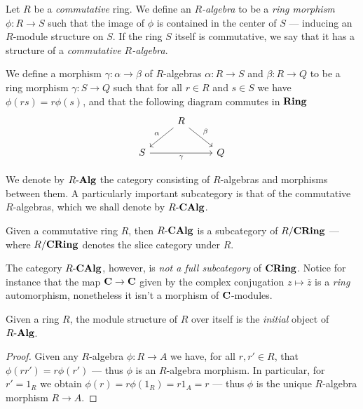 \begin{definition}[\(R\)-algebra]
\label{def:R-algebra}
Let \(R\) be a \emph{commutative} ring. We define an \emph{\(R\)-algebra} to be
a \emph{ring morphism} \(\phi: R \to S\) such that the image of \(\phi\) is
contained in the center of \(S\) --- inducing an \(R\)-module structure on
\(S\). If the ring \(S\) itself is commutative, we say that it has a structure
of a \emph{commutative \(R\)-algebra}.

We define a morphism \(\gamma: \alpha \to \beta\) of \(R\)-algebras
\(\alpha: R \to S\) and \(\beta: R \to Q\) to be a ring morphism
\(\gamma: S \to Q\) such that for all \(r \in R\) and \(s \in S\) we have
\(\phi(r s) = r \phi(s)\), and that the following diagram commutes in \({\textbf{Ring}}\)
\[
\begin{tikzcd}
&R \ar[ld, "\alpha"'] \ar[rd, "\beta"] & \\
S \ar[rr, "\gamma"']& &Q
\end{tikzcd}
\]

We denote by \({R\text{-}\textbf{Alg}}\) the category consisting of \(R\)-algebras and morphisms
between them. A particularly important subcategory is that of the commutative
\(R\)-algebras, which we shall denote by \({R\text{-}\textbf{CAlg}}\).
\end{definition}

\begin{corollary}
\label{cor:CAlg-subcat-CRing}
Given a commutative ring \(R\), then \({R\text{-}\textbf{CAlg}}\) is a subcategory of
\(R/{\textbf{CRing}}\) --- where \(R/{\textbf{CRing}}\) denotes the slice category under \(R\).
\end{corollary}

\begin{example}
\label{exp:CAlg-not-full-subcat-CRing}
The category \({R\text{-}\textbf{CAlg}}\), however, is \emph{not a full subcategory} of
\({\textbf{CRing}}\). Notice for instance that the map \(\mathbf{C} \to \mathbf{C}\) given by
the complex conjugation \(z \mapsto \overline{z}\) is a \emph{ring}
automorphism, nonetheless it isn't a morphism of \(\mathbf{C}\)-modules.
\end{example}

\begin{proposition}
\label{prop:R-initial-R-alg}
Given a ring \(R\), the module structure of \(R\) over itself is the
\emph{initial} object of \({R\text{-}\textbf{Alg}}\).
\end{proposition}

\begin{proof}
Given any \(R\)-algebra \(\phi: R \to A\) we have, for all \(r, r' \in R\), that
\(\phi(r r') = r \phi(r')\) --- thus \(\phi\) is an \(R\)-algebra morphism. In
particular, for \(r' = 1_R\) we obtain \(\phi(r) = r \phi(1_R) = r 1_A = r\) ---
thus \(\phi\) is the unique \(R\)-algebra morphism \(R \to A\).
\end{proof}

